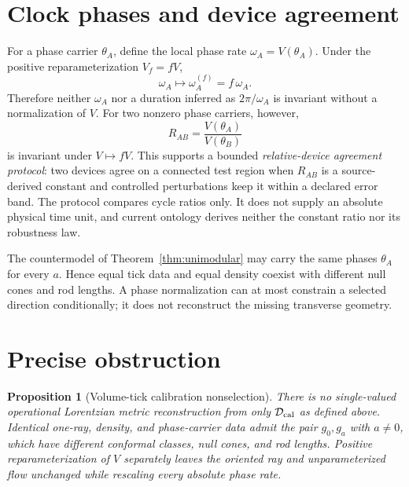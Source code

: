 \documentclass[11pt]{article}
\newtheorem{proposition}[theorem]{Proposition}
\begin{document}
\section{Clock phases and device agreement}

For a phase carrier \(\theta_A\), define the local phase rate
\(\omega_A=V(\theta_A)\).  Under the positive reparameterization
\(V_f=fV\),
\[
  \omega_A\longmapsto \omega_A^{(f)}=f\,\omega_A.
\]
Therefore neither \(\omega_A\) nor a duration inferred as
\(2\pi/\omega_A\) is invariant without a normalization of \(V\).
For two nonzero phase carriers, however,
\[
   R_{AB}=\frac{V(\theta_A)}{V(\theta_B)}
\]
is invariant under \(V\mapsto fV\).  This supports a bounded
\emph{relative-device agreement protocol}: two devices agree on a connected
test region when \(R_{AB}\) is a source-derived constant and controlled
perturbations keep it within a declared error band.  The protocol compares
cycle ratios only.  It does not supply an absolute physical time unit, and
current ontology derives neither the constant ratio nor its robustness law.

The countermodel of Theorem~\ref{thm:unimodular} may carry the same phases
\(\theta_A\) for every \(a\).  Hence equal tick data and equal density coexist
with different null cones and rod lengths.  A phase normalization can at most
constrain a selected direction conditionally; it does not reconstruct the
missing transverse geometry.

\section{Precise obstruction}

\begin{proposition}[Volume-tick calibration nonselection]
\label{prop:obstruction}
There is no single-valued operational Lorentzian metric reconstruction from
only \(\mathcal D_{\rm cal}\) as defined above.  Identical one-ray, density,
and phase-carrier data admit the pair \(g_0,g_a\) with \(a\ne0\), which have
different conformal classes, null cones, and rod lengths.  Positive
reparameterization of \(V\) separately leaves the oriented ray and
unparameterized flow unchanged while rescaling every absolute phase rate.
\end{proposition}
\end{document}
